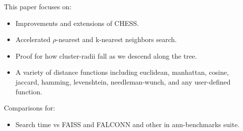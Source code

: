 This paper focuses on:
\begin{itemize}
    \item Improvements and extensions of CHESS.
    \item Accelerated $\rho$-nearest and k-nearest neighbors search.
    \item Proof for how cluster-radii fall as we descend along the tree.
    \item A variety of distance functions including euclidean, manhattan, cosine, jaccard, hamming, levenshtein, needleman-wunch, and any user-defined function.
\end{itemize}

Comparisons for:
\begin{itemize}
    \item Search time vs FAISS and FALCONN and other in ann-benchmarks suite.
\end{itemize}
